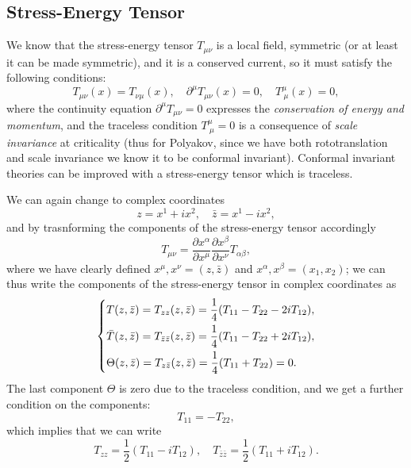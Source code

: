 \subsection{Stress-Energy Tensor}
We know that the stress-energy tensor \(T_{\mu\nu}\) is a local field, symmetric (or at least it can be made symmetric), and it is a conserved current, so it must satisfy the following conditions:
\[
    T_{\mu\nu}(x) = T_{\nu\mu}(x), \quad \partial^\mu T_{\mu\nu}(x) = 0, \quad T^\mu_{\ \mu}(x) = 0,
\]
where the continuity equation \(\partial^\mu T_{\mu\nu} = 0\) expresses the \textit{conservation of energy and momentum}, and the traceless condition \(T^\mu_{\ \mu} = 0\) is a consequence of \textit{scale invariance} at criticality (thus for Polyakov, since we have both rototranslation and scale invariance we know it to be conformal invariant). Conformal invariant theories can be improved with a stress-energy tensor which is traceless.

We can again change to complex coordinates
\[
    z = x^1 + ix^2, \quad \bar{z} = x^1 - ix^2,
\]
and by trasnforming the components of the stress-energy tensor accordingly
\[
    T_{\mu \nu} = \frac{\partial x^\alpha}{\partial x^\mu} \frac{\partial x^\beta}{\partial x^\nu} T_{\alpha \beta},
\]
where we have clearly defined \(x^{\mu}, x^{\nu} = (z, \bar{z})\) and \(x^{\alpha}, x^{\beta} = (x_1, x_2)\); we can thus write the components of the stress-energy tensor in complex coordinates as
\[
    \begin{dcases}
        T(z,\bar{z}) = T_{zz}(z,\bar{z}) = \frac{1}{4}( T_{11} - T_{22} - 2i T_{12} ),                   \\
        \bar{T}(z,\bar{z}) = T_{\bar{z}\bar{z}}(z,\bar{z}) = \frac{1}{4}( T_{11} - T_{22} + 2i T_{12} ), \\
        \Theta(z,\bar{z}) =  T_{z\bar{z}}(z,\bar{z}) = \frac{1}{4}( T_{11} + T_{22} )=0.
    \end{dcases}
\]
The last component \(\Theta\) is zero due to the traceless condition, and we get a further condition on the components:
\[
    T_{11} = - T_{22},
\]
which implies that we can write
\[
    T_{zz} = \frac{1}{2}( T_{11} - i T_{12} ), \quad T_{\bar{z}\bar{z}} = \frac{1}{2}( T_{11} + i T_{12} ).
\]

